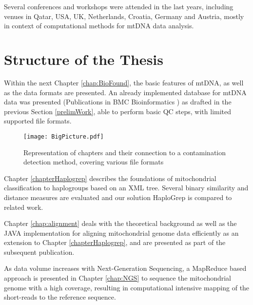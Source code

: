 Several conferences and workshops were attended in the last years, including venues in Qatar, USA, UK, Netherlands, Croatia, Germany and Austria, mostly in context of computational methods for mtDNA data analysis. 

\section{Structure of the Thesis}
\label{sect:ProblChar}
Within the next Chapter \ref{chap:BioFound}, the basic features of mtDNA, as well as the data formats are presented. An already implemented database for mtDNA data was presented (Publications in BMC Bioinformatics \cite{Schoenherr2009, Weissensteiner2010}) as drafted in the previous Section \ref{prelimWork}, able to perform basic QC steps, with limited supported file formats.
\begin{figure}[ht]
\begin{center}
\texttt{[image: BigPicture.pdf]}
\caption[Representation of chapters]{Representation of chapters and their connection to a contamination detection method, covering various file formats }
\label{fig:figureBigPic}
\end{center}
\end{figure}

Chapter \ref{chapterHaplogrep} describes the foundations of mitochondrial classification to haplogroups based on an XML tree. Several binary similarity and distance measures are evaluated and our solution HaploGrep is compared to related work. 


Chapter \ref{chap:alignment} deals with the theoretical background as well as the JAVA implementation for aligning mitochondrial genome data efficiently as an extension to Chapter \ref{chapterHaplogrep}, and are presented as part of the subsequent publication. 

As data volume increases with Next-Generation Sequencing, a MapReduce based approach is presented in Chapter \ref{chap:NGS} to sequence the mitochondrial genome with a high coverage, resulting in computational intensive mapping of the short-reads to the reference sequence. 

